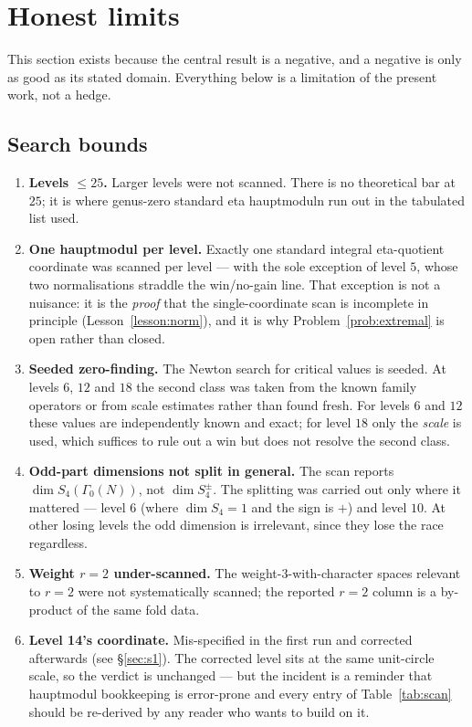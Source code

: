 \documentclass[11pt,reqno]{amsart}
\theoremstyle{plain}
\theoremstyle{definition}
\theoremstyle{remark}
\newcommand{\Ga}{\Gamma_0}
\begin{document}
\section{Honest limits}
\label{sec:limits}

This section exists because the central result is a negative, and a
negative is only as good as its stated domain. Everything below is a
limitation of the present work, not a hedge.

\subsection{Search bounds}

\begin{enumerate}[label=(L\arabic*),leftmargin=3em]
\item \textbf{Levels $\le25$.} Larger levels were not scanned. There is
  no theoretical bar at $25$; it is where genus-zero standard eta
  hauptmoduln run out in the tabulated list used.
\item \textbf{One hauptmodul per level.} Exactly one standard integral
  eta-quotient coordinate was scanned per level --- with the sole
  exception of level $5$, whose two normalisations straddle the
  win/no-gain line. That exception is not a nuisance: it is the
  \emph{proof} that the single-coordinate scan is incomplete in principle
  (Lesson~\ref{lesson:norm}), and it is why
  Problem~\ref{prob:extremal} is open rather than closed.
\item \textbf{Seeded zero-finding.} The Newton search for critical values
  is seeded. At levels $6$, $12$ and $18$ the second class was taken from
  the known family operators or from scale estimates rather than found
  fresh. For levels $6$ and $12$ these values are independently known and
  exact; for level $18$ only the \emph{scale} is used, which suffices to
  rule out a win but does not resolve the second class.
\item \textbf{Odd-part dimensions not split in general.} The scan reports
  $\dim S_4(\Ga(N))$, not $\dim S_4^\pm$. The splitting was carried out
  only where it mattered --- level $6$ (where $\dim S_4=1$ and the sign is
  $+$) and level $10$. At other losing levels the odd dimension is
  irrelevant, since they lose the race regardless.
\item \textbf{Weight $r=2$ under-scanned.} The weight-$3$-with-character
  spaces relevant to $r=2$ were not systematically scanned; the reported
  $r=2$ column is a by-product of the same fold data.
\item \textbf{Level 14's coordinate.} Mis-specified in the first run and
  corrected afterwards (see \S\ref{sec:s1}). The corrected level sits at
  the same unit-circle scale, so the verdict is unchanged --- but the
  incident is a reminder that hauptmodul bookkeeping is error-prone and
  every entry of Table~\ref{tab:scan} should be re-derived by any reader
  who wants to build on it.
\end{enumerate}
\end{document}

